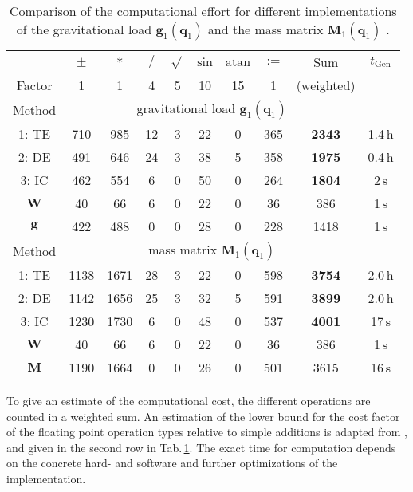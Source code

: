 \documentclass{svproc}
\newcommand{\bm}[1]{\boldsymbol{#1}}
\begin{document}
\begin{table}[tb]
    \caption{Comparison of the computational effort for different implementations of the gravitational load $\bm{g}_1(\bm{q}_1)$ and the mass matrix $\bm{M}_1(\bm{q}_1)$ .}
    \label{tab:computation}
    \centering
    \setlength\tabcolsep{3pt}
    \small
    \begin{tabular}[t]{|c|c|c|c|c|c|c|c|c|c|}
        \hline
         & $\pm$ & $*$ & $/$ & $\sqrt{}$ & $\mathrm{sin}$ & $\mathrm{atan}$ & $:=$ & Sum & $t_{\mathrm{Gen}}$ \\
        Factor & 1 & 1 & 4 & 5 & 10 & 15 & 1 & (weighted) & \\
        \hline
        Method & \multicolumn{8}{c}{gravitational load $\bm{g}_1(\bm{q}_1)$} &  \\
        \hline
        \rowcolor{Gray}
        1: TE  & 710 & 985 & 12 & 3 & 22 & 0 & 365 & \textbf{2343} & 1.4\,h \\
        \rowcolor{Gray}
        2: DE & 491 & 646 & 24 & 3 & 38 & 5 & 358 & \textbf{1975} & 0.4\,h \\
        \rowcolor{Gray}
        3: IC & 462 & 554 & 6 & 0 & 50 & 0 & 264 & \textbf{1804} & 2\,s \\
        $\bm{W}$ & 40 & 66 & 6 & 0 & 22 & 0 & 36 & 386 & 1\,s \\
        $\bm{g}$ & 422 & 488 & 0 & 0 & 28 & 0 & 228 & 1418 & 1\,s \\
        \hline
        Method & \multicolumn{8}{c}{mass matrix $\bm{M}_1(\bm{q}_1)$} & \\
        \hline
        \rowcolor{Gray}
        1: TE  & 1138 & 1671 & 28 & 3 & 22 & 0 & 598 & \textbf{3754} & 2.0\,h \\
        \rowcolor{Gray}
        2: DE & 1142 & 1656 & 25 & 3 & 32 & 5 & 591 & \textbf{3899} & 2.0\,h \\
        \rowcolor{Gray}
        3: IC & 1230 & 1730 & 6 & 0 & 48 & 0 & 537 & \textbf{4001} & 17\,s \\
        $\bm{W}$ & 40 & 66 & 6 & 0 & 22 & 0 & 36 & 386 & 1\,s \\
        $\bm{M}$ & 1190 & 1664 & 0 & 0 & 26 & 0 & 501 & 3615 & 16\,s \\
        \hline
    \end{tabular}
    \vspace{-0.5cm}
\end{table}
%

To give an estimate of the computational cost, the different operations are counted in a weighted sum. An estimation of the lower bound for the cost factor of the floating point  operation types relative to simple additions is adapted from \cite{Atkinson2014}, \cite{Hindriksen2012} and given in the second row in Tab.\,\ref{tab:computation}.
The exact time for computation depends on the concrete hard- and software and further optimizations of the implementation.
\end{document}
